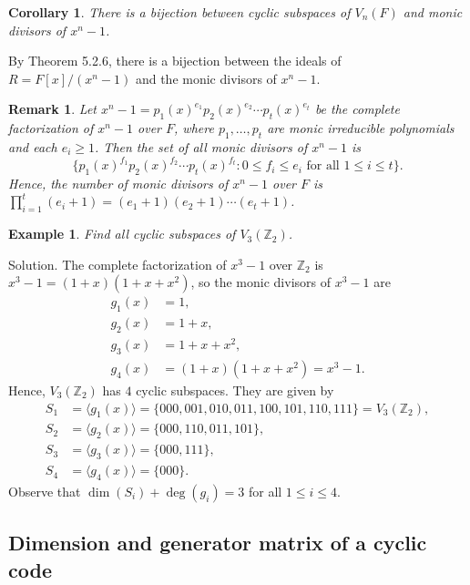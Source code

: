 \documentclass[10pt]{article}
\makeatletter
\newcommand{\Z}{\mathbb{Z}}
\theoremstyle{newstyle}
\newtheorem{cor}[thm]{Corollary}
\newtheorem{remark}[thm]{Remark}
\newtheorem{exmp}[thm]{Example}
\newenvironment{pf}[1][\proofname]{\par
  \pushQED{\qed}%
  \normalfont \topsep0\p@\relax
  \trivlist
  \item[\hskip\labelsep\scshape
  #1\@addpunct{.}]\ignorespaces
}{%
  \popQED\endtrivlist\@endpefalse
}
\makeatother
\begin{document}
\begin{cor}
There is a bijection between cyclic subspaces of $V_n(F)$ and monic divisors of $x^n-1$. 
\end{cor}
\begin{pf}
By Theorem 5.2.6, there is a bijection between the ideals of $R = F[x]/(x^n-1)$ and 
the monic divisors of $x^n-1$. 
\end{pf}

\begin{remark}
Let $x^n-1 = p_1(x)^{e_1} p_2(x)^{e_2} \cdots p_t(x)^{e_t}$ be the complete factorization of 
$x^n-1$ over $F$, where $p_1, \dots, p_t$ are monic irreducible polynomials and 
each $e_i \geq 1$. Then the set of all monic divisors of $x^n - 1$ is 
\[ \{p_1(x)^{f_1} p_2(x)^{f_2} \cdots p_t(x)^{f_t} : 0 \leq f_i \leq e_i \text{ for all } 1 \leq i \leq t\}. \]
Hence, the number of monic divisors of $x^n - 1$ over $F$ is $
\prod_{i=1}^t (e_i+1) = (e_1 + 1)(e_2 + 1) \cdots (e_t + 1)$. 
\end{remark}

\begin{exmp}
Find all cyclic subspaces of $V_3(\Z_2)$. 
\end{exmp}
{\sc Solution.} The complete factorization of $x^3 - 1$ over $\Z_2$ is $x^3 - 1 
= (1+x)(1+x+x^2)$, so the monic divisors of $x^3 - 1$ are 
\begin{align*}
    g_1(x) &= 1, \\
    g_2(x) &= 1+x, \\
    g_3(x) &= 1+x+x^2, \\
    g_4(x) &= (1+x)(1+x+x^2) = x^3 - 1.
\end{align*}
Hence, $V_3(\Z_2)$ has $4$ cyclic subspaces. They are given by 
\begin{align*}
    S_1 &= \langle g_1(x) \rangle = \{000, 001, 010, 011, 100, 101, 110, 111\} = V_3(\Z_2), \\
    S_2 &= \langle g_2(x) \rangle = \{000, 110, 011, 101\}, \\
    S_3 &= \langle g_3(x) \rangle = \{000, 111\}, \\
    S_4 &= \langle g_4(x) \rangle = \{000\}.
\end{align*}
Observe that $\dim(S_i) + \deg(g_i) = 3$ for all $1 \leq i \leq 4$. 

\subsection{Dimension and generator matrix of a cyclic code}
\end{document}
